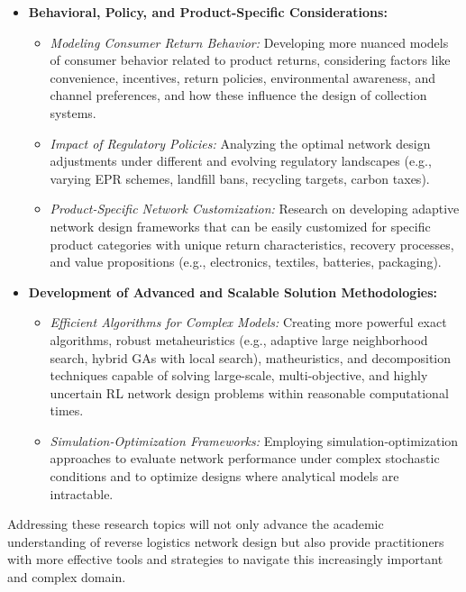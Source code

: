 \begin{itemize}[label=, leftmargin=2mm]
    \item \textbf{Behavioral, Policy, and Product-Specific Considerations:}
        \begin{itemize}
            \item \textit{Modeling Consumer Return Behavior:} Developing more nuanced models of consumer behavior related to product returns, considering factors like convenience, incentives, return policies, environmental awareness, and channel preferences, and how these influence the design of collection systems.
            \item \textit{Impact of Regulatory Policies:} Analyzing the optimal network design adjustments under different and evolving regulatory landscapes (e.g., varying EPR schemes, landfill bans, recycling targets, carbon taxes).
            \item \textit{Product-Specific Network Customization:} Research on developing adaptive network design frameworks that can be easily customized for specific product categories with unique return characteristics, recovery processes, and value propositions (e.g., electronics, textiles, batteries, packaging).
        \end{itemize}

    \item \textbf{Development of Advanced and Scalable Solution Methodologies:}
        \begin{itemize}
            \item \textit{Efficient Algorithms for Complex Models:} Creating more powerful exact algorithms, robust metaheuristics (e.g., adaptive large neighborhood search, hybrid GAs with local search), matheuristics, and decomposition techniques capable of solving large-scale, multi-objective, and highly uncertain RL network design problems within reasonable computational times.
            \item \textit{Simulation-Optimization Frameworks:} Employing simulation-optimization approaches to evaluate network performance under complex stochastic conditions and to optimize designs where analytical models are intractable.
        \end{itemize}
\end{itemize}
Addressing these research topics will not only advance the academic understanding of reverse logistics network design but also provide practitioners with more effective tools and strategies to navigate this increasingly important and complex domain.